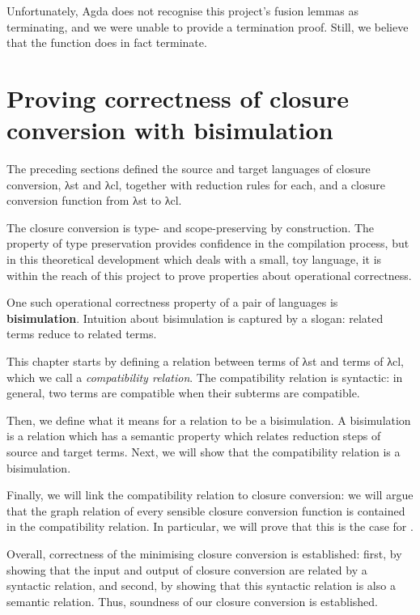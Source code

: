 \documentclass[bsc,frontabs,oneside,singlespacing,parskip,deptreport]{infthesis}
\theoremstyle{definition}
\theoremstyle{lemma}
\begin{document}
Unfortunately, Agda does not recognise this project's fusion lemmas as
terminating, and we were unable to provide a termination proof. Still,
we believe that the function does in fact terminate.


\chapter{Proving correctness of closure conversion with bisimulation}
\label{cha:prov-corr-clos}

The preceding sections defined the source and target languages of
closure conversion, λst and λcl, together with reduction rules for
each, and a closure conversion function  from λst to λcl.

The   closure conversion is type- and
scope-preserving by construction. The property of type preservation
provides confidence in the compilation process, but in this
theoretical development which deals with a small, toy language, it is
within the reach of this project to prove properties about operational
correctness. 

One such operational correctness property of a pair of languages is
\textbf{bisimulation}. Intuition about bisimulation is captured by a
slogan: related terms reduce to related terms. 

This chapter starts by defining a relation between terms of λst and
terms of λcl, which we call a \textit{compatibility relation}. The
compatibility relation is syntactic: in general, two terms are
compatible when their subterms are compatible.

Then, we define what it means for a relation to be a bisimulation. A
bisimulation is a relation which has a semantic property which relates
reduction steps of source and target terms. Next, we will show that
the compatibility relation is a bisimulation.

Finally, we will link the compatibility relation to closure
conversion: we will argue that the graph relation of every sensible
closure conversion function is contained in the compatibility
relation. In particular, we will prove that this is the case for
.

Overall, correctness of the minimising closure conversion is
established: first, by showing that the input and output of closure
conversion are related by a syntactic relation, and second, by showing
that this syntactic relation is also a semantic relation. Thus,
soundness of our closure conversion is established.
\end{document}
